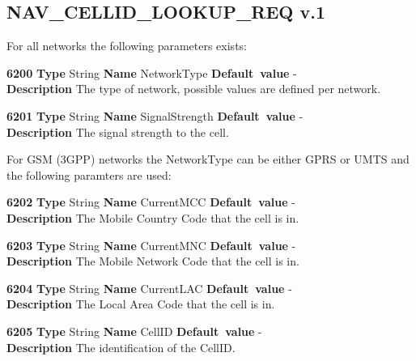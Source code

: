 \documentclass[a4paper]{article}
\begin{document}
\subsection{NAV\_CELLID\_LOOKUP\_REQ v.1}

For all networks the following parameters exists:
\begin{list}{\textbf{ParamID}}{}
\item \textbf{6200} \textbf{Type} String \textbf{Name} NetworkType
                 \textbf{Default~value} - \\
  \textbf{Description} The type of network, possible values are defined per 
  network.
\item \textbf{6201} \textbf{Type} String \textbf{Name} SignalStrength
                 \textbf{Default~value} - \\
  \textbf{Description} The signal strength to the cell.
\end{list}

For GSM (3GPP) networks the NetworkType can be either GPRS or UMTS and
the following paramters are used:
\begin{list}{\textbf{ParamID}}{}
\item \textbf{6202} \textbf{Type} String \textbf{Name} CurrentMCC
                 \textbf{Default~value} - \\
  \textbf{Description} The Mobile Country Code that the cell is in.
\item \textbf{6203} \textbf{Type} String \textbf{Name} CurrentMNC
                 \textbf{Default~value} - \\
  \textbf{Description} The Mobile Network Code that the cell is in.
\item \textbf{6204} \textbf{Type} String \textbf{Name} CurrentLAC
                 \textbf{Default~value} - \\
  \textbf{Description} The Local Area Code that the cell is in.
\item \textbf{6205} \textbf{Type} String \textbf{Name} CellID
                 \textbf{Default~value} - \\
  \textbf{Description} The identification of the CellID.
\end{list}
\end{document}
